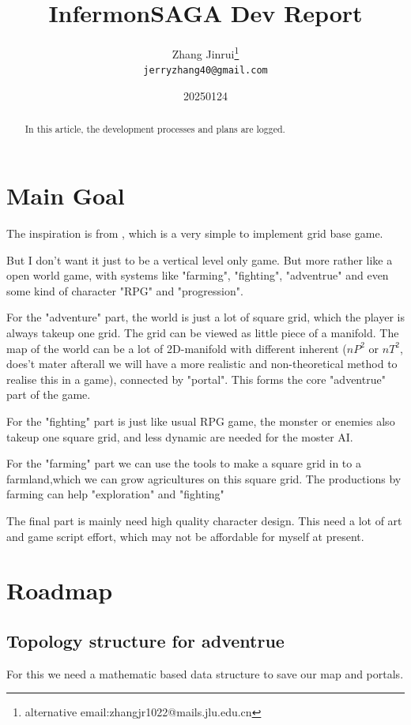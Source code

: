 \documentclass{article}
\title{InfermonSAGA Dev Report}
\author{Zhang Jinrui\thanks{alternative email:zhangjr1022@mails.jlu.edu.cn} \\ \texttt{jerryzhang40@gmail.com}}
\date{20250124}  %
\theoremstyle{definition} %
\begin{document}
\maketitle

\begin{abstract}
    In this article, the development processes
    and plans are logged.
\end{abstract}

\section{Main Goal}
The inspiration is from
\cite[DragonDungeonRun]{Dragon_Dungeon_Run},
which is a very simple to implement grid base
game.

But I don't want it just to be a vertical
level only game.
But more rather like a open world game,
with systems like "farming", "fighting",
"adventrue" and even some kind of character
"RPG" and "progression".

For the "adventure" part, the world is just
a lot of square grid, which the player is
always takeup one grid.
The grid can be viewed as
little piece of a manifold.
The map of the world can be a lot of
2D-manifold with different inherent
($nP^2$ or $nT^2$, does't mater afterall
we will have a more realistic and
non-theoretical method to realise this in
a game),
connected by "portal". This forms the
core "adventrue" part of the game.

For the "fighting" part is just like
usual RPG game, the monster or enemies also
takeup one square grid, and less dynamic
are needed for the moster AI.

For the "farming" part we can use the
tools to make a square grid in to a
farmland,which we can grow agricultures
on this square grid.
The productions by farming can help
"exploration" and "fighting"

The final part is mainly need high
quality character design. This need
a lot of art and game script effort,
which may not be affordable for myself
at present.

\section{Roadmap}
\subsection[adventrue]{Topology structure for adventrue}
For this we need a mathematic based
data structure to save our map and
portals.
\end{document}
